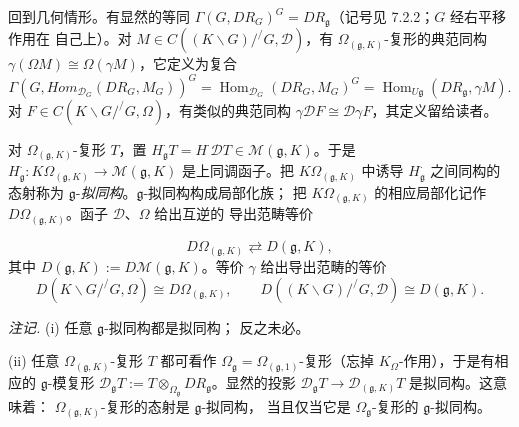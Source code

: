  回到几何情形。有显然的等同
$\Gamma(G,DR_G)^G=DR_{\mathfrak{g}}$（记号见 7.2.2；$G$ 经右平移作用在
自己上）。对 $M\in C((K\backslash G)/^{/}G,\mathcal{D})$，有
$\Omega_{(\mathfrak{g},K)}$-复形的典范同构
$\gamma(\Omega M)\cong\Omega(\gamma M)$，它定义为复合
\[
\Gamma(G,\mathit{Hom}_{\mathcal{D}_G}(DR_G,M_G))^G
=\operatorname{Hom}_{\mathcal{D}_G}(DR_G,M_G)^G
=\operatorname{Hom}_{U\mathfrak{g}}(DR_{\mathfrak{g}},\gamma M).
\]
对 $F\in C(K\backslash G/^{/}G,\Omega)$，有类似的典范同构
$\gamma\mathcal{D}F\cong\mathcal{D}\gamma F$，其定义留给读者。

 对 $\Omega_{(\mathfrak{g},K)}$-复形 $T$，置
$H_{\mathfrak{g}}^{\cdot}T=H^{\cdot}\mathcal{D}T
\in\mathcal{M}(\mathfrak{g},K)$。于是
$H_{\mathfrak{g}}^{\cdot}:K\Omega_{(\mathfrak{g},K)}\to
\mathcal{M}(\mathfrak{g},K)$ 是上同调函子。把
$K\Omega_{(\mathfrak{g},K)}$ 中诱导 $H_{\mathfrak{g}}^{\cdot}$ 之间同构的
态射称为 $\mathfrak{g}$-\emph{拟同构}。$\mathfrak{g}$-拟同构构成局部化族；
把 $K\Omega_{(\mathfrak{g},K)}$ 的相应局部化记作
$D\Omega_{(\mathfrak{g},K)}$。函子 $\mathcal{D}$、$\Omega$ 给出互逆的
导出范畴等价


\begin{equation}\tag{326}
D\Omega_{(\mathfrak{g},K)}\rightleftarrows D(\mathfrak{g},K),
\end{equation}
其中 $D(\mathfrak{g},K):=D\mathcal{M}(\mathfrak{g},K)$。等价 $\gamma$
给出导出范畴的等价
\begin{equation}\tag{327}
D(K\backslash G/^{/}G,\Omega)\cong D\Omega_{(\mathfrak{g},K)},\qquad
D((K\backslash G)/^{/}G,\mathcal{D})\cong D(\mathfrak{g},K).
\end{equation}

 \emph{注记.} (i) 任意 $\mathfrak{g}$-拟同构都是拟同构；
反之未必。

(ii) 任意 $\Omega_{(\mathfrak{g},K)}$-复形 $T$ 都可看作
$\Omega_{\mathfrak{g}}=\Omega_{(\mathfrak{g},1)}$-复形（忘掉
$K_\Omega$-作用），于是有相应的 $\mathfrak{g}$-模复形
$\mathcal{D}_{\mathfrak{g}}T:=T\otimes_{\Omega_{\mathfrak{g}}}
DR_{\mathfrak{g}}$。显然的投影 $\mathcal{D}_{\mathfrak{g}}T\to
\mathcal{D}_{(\mathfrak{g},K)}T$ 是拟同构。这意味着：
$\Omega_{(\mathfrak{g},K)}$-复形的态射是 $\mathfrak{g}$-拟同构，
当且仅当它是 $\Omega_{\mathfrak{g}}$-复形的 $\mathfrak{g}$-拟同构。

